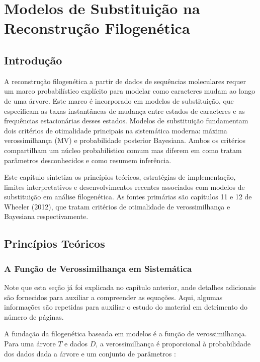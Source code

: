 
\chapter{Modelos de Substituição na Reconstrução Filogenética}

\section{Introdução}

A reconstrução filogenética a partir de dados de sequências moleculares requer um marco probabilístico explícito para modelar como caracteres mudam ao longo de uma árvore. Este marco é incorporado em modelos de substituição, que especificam as taxas instantâneas de mudança entre estados de caracteres e as frequências estacionárias desses estados. Modelos de substituição fundamentam dois critérios de otimalidade principais na sistemática moderna: máxima verossimilhança (MV) e probabilidade posterior Bayesiana. Ambos os critérios compartilham um núcleo probabilístico comum mas diferem em como tratam parâmetros desconhecidos e como resumem inferência.

Este capítulo sintetiza os princípios teóricos, estratégias de implementação, limites interpretativos e desenvolvimentos recentes associados com modelos de substituição em análise filogenética. As fontes primárias são capítulos 11 e 12 de Wheeler (2012), que tratam critérios de otimalidade de verossimilhança e Bayesiana respectivamente.

\section{Princípios Teóricos}

\subsection{A Função de Verossimilhança em Sistemática}

Note que esta seção já foi explicada no capítulo anterior, ande detalhes adicionais são fornecidos para auxiliar a compreender as equações. Aqui, algumas informações são repetidas para auxiliar o estudo do material em detrimento do número de páginas.

A fundação da filogenética baseada em modelos é a função de verossimilhança. Para uma árvore $T$ e dados $D$, a verossimilhança é proporcional à probabilidade dos dados dada a árvore e um conjunto de parâmetros \parencite{edwards1972}:

